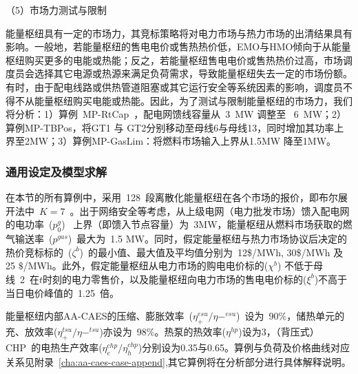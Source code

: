 （5）市场力测试与限制

能量枢纽具有一定的市场力，其竞标策略将对电力市场与热力市场的出清结果具有影响。一般地，若能量枢纽的售电电价或售热热价低，EMO与HMO倾向于从能量枢纽购买更多的电能或热能；反之，若能量枢纽售电电价或售热热价过高，市场调度员会选择其它电源或热源来满足负荷需求，导致能量枢纽失去一定的市场份额。有时，由于配电线路或供热管道阻塞或其它运行安全等系统因素的影响，调度员不得不从能量枢纽购买电能或热能。因此，为了测试与限制能量枢纽的市场力，我们将分析：1）算例~MP-RtCap~，配电网馈线容量从~3~MW 调整至 ~6~MW；2）算例MP-TBPos，将GT1 与 GT2分别移动至母线6与母线13，同时增加其功率上界至2MW；3）算例MP-GasLim：将燃料市场输入上界从1.5MW 降至1MW。

\subsubsection{通用设定及模型求解}

在本节的所有算例中，采用~128~段离散化能量枢纽在各个市场的报价，即布尔展开法中~$K=7$~。出于网络安全等考虑，从上级电网（电力批发市场）馈入配电网的电功率~($p_0^g$)~ 上界（即馈入节点容量）为~3MW，能量枢纽从燃料市场获取的燃气输送率~($p^{gas}$)~最大为~1.5 MW。同时，假定能量枢纽与热力市场协议后决定的热价竞标标的~($\zeta^b$)~的最小值、最大值及平均值分别为~12\$/MWh, 30\$/MWh 及 25 $\$$/MWh。此外，假定能量枢纽从电力市场的购电电价标的($\chi^b$) 不低于母线~2~在$t$时刻的电力零售价，以及能量枢纽向电力市场的售电电价标的($\xi^b$)不高于当日电价峰值的~1.25~倍。

能量枢纽内部AA-CAES的压缩、膨胀效率~($\eta_+^{esu}/\eta-^{esu}$)~设为~90$\%$，储热单元的充、放效率($\eta_+^{tsu}/\eta-^{tsu}$)亦设为~98$\%$。热泵的热效率($\eta^{hp}$)设为3，（背压式）CHP~的电热生产效率($\eta_e^{chp}/\eta_h^{chp}$)分别设为0.35与0.65。算例与负荷及价格曲线对应关系见附录~\ref{cha:aa-caes-case-append},其它算例将在分析部分进行具体解释说明。

